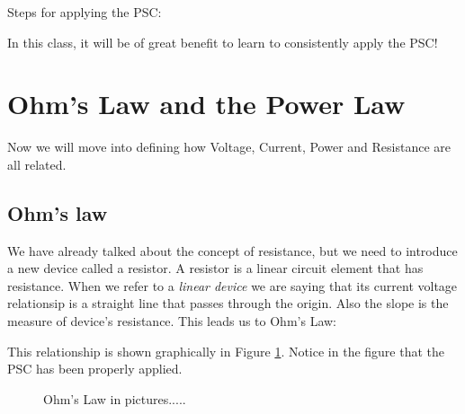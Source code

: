 \documentclass{handout}
\begin{document}
Steps for applying the PSC:

In this class, it will be of great benefit to learn to consistently apply the PSC!

\section{Ohm's Law and the Power Law}

Now we will move into defining how Voltage, Current, Power and Resistance are all related.

\subsection{Ohm's law}
We have already talked about the concept of resistance, but we need to introduce a new device called a resistor.  A resistor is a linear circuit element that has resistance.  When we refer to a {\em linear device} we are saying that its current voltage relationsip is a straight line that passes through the origin.  Also the slope is the measure of device's resistance.  This leads us to Ohm's Law:


This relationship is shown graphically in Figure \ref{fig: Ohms_law}.  Notice in the figure that the PSC has been properly applied.

\begin{figure}
\centering
{}
\caption{Ohm's Law in pictures.....}
\label{fig: Ohms_law}
\end{figure}
\end{document}
